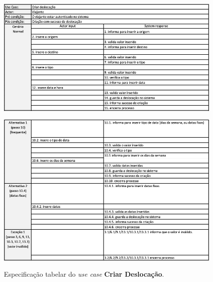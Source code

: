 \newpage

\begin{figure}[H]
    \centering
	\includegraphics[scale=0.58]{imagens/use-case-especificado-1.png}
	\label{img:duc1}
\end{figure}

\begin{figure}[H]
    \centering
	\includegraphics[scale=0.58]{imagens/use-case-especificado-2.png}
	\label{img:duc1}
	\caption{Especificação tabelar do \emph{use case} \textbf{Criar Deslocação}.}
\end{figure}